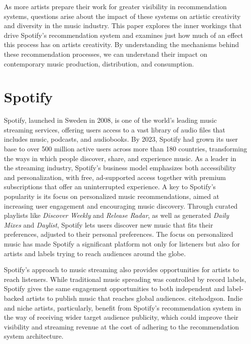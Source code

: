 \documentclass[10pt,twoside,slovak,a4paper]{article}
\begin{document}
As more artists prepare their work for greater visibility in recommendation systems, questions arise about the impact of these systems on artistic creativity and diversity in the music industry. This paper explores the inner workings that drive Spotify's recommendation system and examines just how much of an effect this process has on artists creativity. By understanding the mechanisms behind these recommendation processes, we can understand their impact on contemporary music production, distribution, and consumption.
\section{Spotify}\label{spotify}
Spotify, launched in Sweden in 2008, is one of the world's leading music streaming services, offering users access to a vast library of audio files that includes music, podcasts, and audiobooks.
By 2023, Spotify had grown its user base to over 500 million active users across more than 180 countries, transforming the ways in which people discover, share, and experience music\cite{spotify}. As a leader in the streaming industry, Spotify's business model emphasizes both accessibility and personalization, with free, ad-supported access together with premium subscriptions that offer an uninterrupted experience.
A key to Spotify's popularity is its focus on personalized music recommendations, aimed at increasing user engagement and encouraging music discovery. Through curated playlists like \textit{Discover Weekly} and \textit{Release Radar}, as well as generated \textit{Daily Mixes} and \textit{Daylist}\cite{Freeman_Gibbs_Nansen_2022}, Spotify lets users discover new music that fits their preferences, adjusted to their personal preferences. The focus on personalized music has made Spotify a significant platform not only for listeners but also for artists and labels trying to reach audiences around the globe.

Spotify's approach to music streaming also provides opportunities for artists to reach listeners. While traditional music spreading was controlled by record labels, Spotify gives the same engagement opportunities to both independent and label-backed artists to publish music that reaches global audiences. cite{hodgson}. Indie and niche artists, particularly, benefit from Spotify's recommendation system in the way of receiving wider target audience publicity, which could improve their visibility and streaming revenue at the cost of adhering to the recommendation system architecture.
\end{document}

